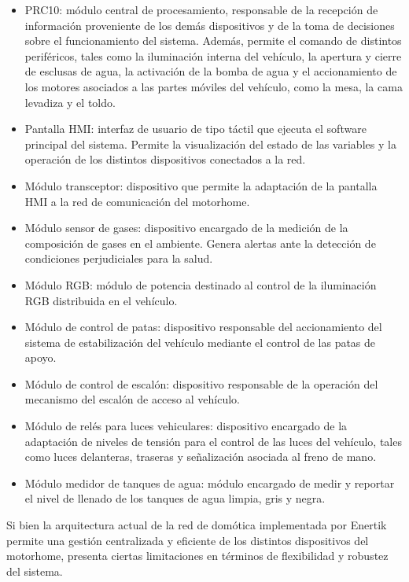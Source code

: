 \begin{itemize}
    \item PRC10: módulo central de procesamiento, responsable de la recepción de información proveniente de los demás dispositivos y de la toma de decisiones sobre el funcionamiento del sistema. Además, permite el comando de distintos periféricos, tales como la iluminación interna del vehículo, la apertura y cierre de esclusas de agua, la activación de la bomba de agua y el accionamiento de los motores asociados a las partes móviles del vehículo, como la mesa, la cama levadiza y el toldo.
    \item Pantalla HMI: interfaz de usuario de tipo táctil que ejecuta el software principal del sistema. Permite la visualización del estado de las variables y la operación de los distintos dispositivos conectados a la red.
    \item Módulo transceptor: dispositivo que permite la adaptación de la pantalla HMI a la red de comunicación del motorhome.
    \item Módulo sensor de gases: dispositivo encargado de la medición de la composición de gases en el ambiente. Genera alertas ante la detección de condiciones perjudiciales para la salud.
    \item Módulo RGB: módulo de potencia destinado al control de la iluminación RGB distribuida en el vehículo.
    \item Módulo de control de patas: dispositivo responsable del accionamiento del sistema de estabilización del vehículo mediante el control de las patas de apoyo.
    \item Módulo de control de escalón: dispositivo responsable de la operación del mecanismo del escalón de acceso al vehículo.
    \item Módulo de relés para luces vehiculares: dispositivo encargado de la adaptación de niveles de tensión para el control de las luces del vehículo, tales como luces delanteras, traseras y señalización asociada al freno de mano.
    \item Módulo medidor de tanques de agua: módulo encargado de medir y reportar el nivel de llenado de los tanques de agua limpia, gris y negra.
\end{itemize}

Si bien la arquitectura actual de la red de domótica implementada por Enertik permite una gestión centralizada y eficiente de los distintos dispositivos del motorhome, presenta ciertas limitaciones en términos de flexibilidad y robustez del sistema.

